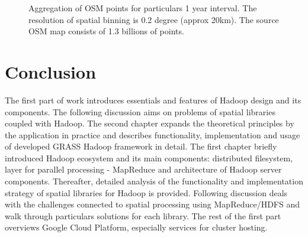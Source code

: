 \documentclass[a4paper,12pt,oneside]{report}
\begin{document}
\begin{figure}[!h]
		\label{figur}\caption{Aggregation of OSM points for particulars 1 year interval. 
		The resolution of spatial binning is 0.2 degree (approx 20km). The source OSM map consists of 1.3 billions of points.
		}
		\label{fig:outmap1}
	\end{figure}
	

	
	\newpage
	\section{Conclusion}
	
   The first part of work introduces essentials and features of Hadoop design and its
   components. The following discussion aims on problems of spatial libraries coupled with Hadoop.
   The second chapter expands the theoretical principles by the application in practice and describes
   functionality, implementation and usage of developed GRASS Hadoop framework in detail.
   The first chapter briefly introduced Hadoop ecosystem and its main components: distributed filesystem, layer for parallel processing - MapReduce and architecture of Hadoop server components. Thereafter, detailed analysis of the
   functionality and implementation strategy of spatial libraries for Hadoop is
   provided. Following discussion deals with the challenges connected to spatial
   processing using MapReduce/HDFS and walk through particulars solutions for each
   library. The rest of the first part overviews Google Cloud Platform,
   especially services for cluster hosting.
   
\end{document}
